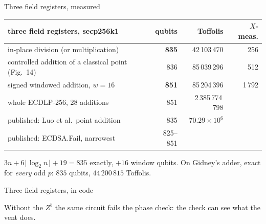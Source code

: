 \documentclass[aspectratio=169,11pt]{beamer}
\newcommand{\code}[2][]{}
\begin{document}
\begin{frame}{Three field registers, measured}
  \centering
  \vskip3mm
  \footnotesize
  \renewcommand{\arraystretch}{1.08}
  \begin{tabular}{@{}lrrr@{}}
    \toprule
    three field registers, secp256k1 & qubits & Toffolis & $X$-meas. \\
    \midrule
    in-place division (or multiplication) & \textbf{835} & 42\,103\,470 & 256 \\
    controlled addition of a classical point (Fig.~14) & 836 & 85\,039\,296 & 512 \\
    signed windowed addition, $w=16$ & \textbf{851} & 85\,204\,396 & 1\,792 \\
    whole ECDLP-256, 28 additions & 851 & 2\,385\,774\,798 & \\
    \midrule
    published: Luo et al.\ point addition & 835 & $70.29\times10^6$ & \\
    published: ECDSA.Fail, narrowest & 825--851 & & \\
    \bottomrule
  \end{tabular}\par
  \vskip2mm
  \raggedright{\small $3n+6\lfloor\log_2n\rfloor+19=835$ exactly, $+16$ window qubits. On Gidney's adder, exact for \emph{every} odd $p$: $835$ qubits, $44\,200\,815$ Toffolis.}
\end{frame}

\begin{frame}[fragile]{Three field registers, in code}
  \code[basicstyle=\ttfamily\fontsize{7.3}{8.4}\selectfont]{div3.py}
  {\small Without the $Z^b$ the same circuit fails the phase check: the check can see what the vent does.}
\end{frame}
\end{document}
